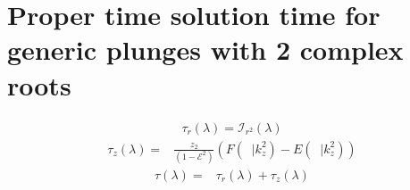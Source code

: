 \documentclass[12pt, amsmath]{revtex4-2}
\newcommand\lam{\lambda}
\newcommand\EN{\mathcal{E}}
\DeclareMathOperator{\amz}{\xi_z}
\begin{document}
\section{Proper time solution time for generic plunges with 2 complex roots}\label{app:2Cproper}
\begin{align}
    \tau_r(\lam) =\mathcal{I}_{r^2}(\lam) 
\end{align}
\begin{align}
    \tau_z(\lam) =&\frac{ z_2 }{(1-\EN^2)}\left( F(\amz|k_z^2 )-E(\amz|k_z^2)\right)
\end{align}
\begin{align}
    \tau(\lam) =& \tau_r(\lam)+ \tau_z(\lam)
\end{align}
\end{document}
